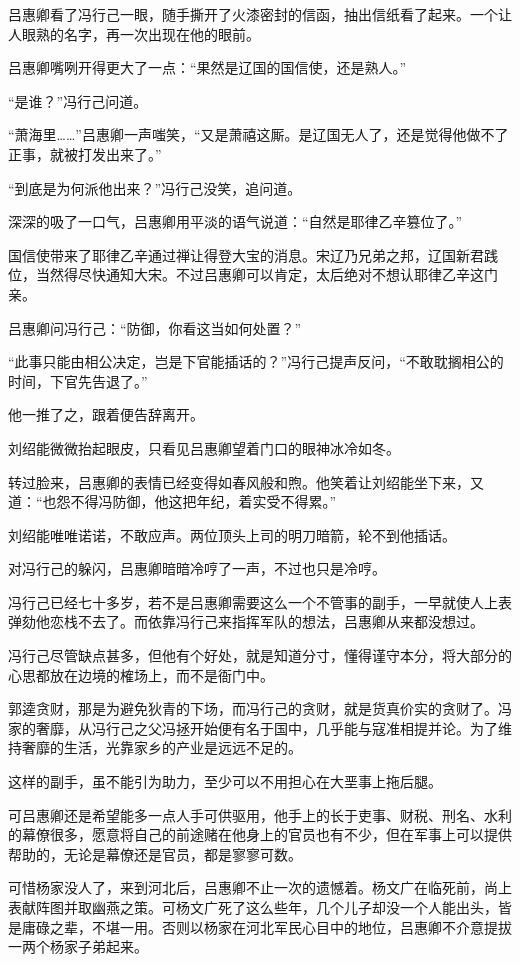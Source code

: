 吕惠卿看了冯行己一眼，随手撕开了火漆密封的信函，抽出信纸看了起来。一个让人眼熟的名字，再一次出现在他的眼前。

吕惠卿嘴咧开得更大了一点：“果然是辽国的国信使，还是熟人。”

“是谁？”冯行己问道。

“萧海里……”吕惠卿一声嗤笑，“又是萧禧这厮。是辽国无人了，还是觉得他做不了正事，就被打发出来了。”

“到底是为何派他出来？”冯行己没笑，追问道。

深深的吸了一口气，吕惠卿用平淡的语气说道：“自然是耶律乙辛篡位了。”

国信使带来了耶律乙辛通过禅让得登大宝的消息。宋辽乃兄弟之邦，辽国新君践位，当然得尽快通知大宋。不过吕惠卿可以肯定，太后绝对不想认耶律乙辛这门亲。

吕惠卿问冯行己：“防御，你看这当如何处置？”

“此事只能由相公决定，岂是下官能插话的？”冯行己提声反问，“不敢耽搁相公的时间，下官先告退了。”

他一推了之，跟着便告辞离开。

刘绍能微微抬起眼皮，只看见吕惠卿望着门口的眼神冰冷如冬。

转过脸来，吕惠卿的表情已经变得如春风般和煦。他笑着让刘绍能坐下来，又道：“也怨不得冯防御，他这把年纪，着实受不得累。”

刘绍能唯唯诺诺，不敢应声。两位顶头上司的明刀暗箭，轮不到他插话。

对冯行己的躲闪，吕惠卿暗暗冷哼了一声，不过也只是冷哼。

冯行己已经七十多岁，若不是吕惠卿需要这么一个不管事的副手，一早就使人上表弹劾他恋栈不去了。而依靠冯行己来指挥军队的想法，吕惠卿从来都没想过。

冯行己尽管缺点甚多，但他有个好处，就是知道分寸，懂得谨守本分，将大部分的心思都放在边境的榷场上，而不是衙门中。

郭逵贪财，那是为避免狄青的下场，而冯行己的贪财，就是货真价实的贪财了。冯家的奢靡，从冯行己之父冯拯开始便有名于国中，几乎能与寇准相提并论。为了维持奢靡的生活，光靠家乡的产业是远远不足的。

这样的副手，虽不能引为助力，至少可以不用担心在大垩事上拖后腿。

可吕惠卿还是希望能多一点人手可供驱用，他手上的长于吏事、财税、刑名、水利的幕僚很多，愿意将自己的前途赌在他身上的官员也有不少，但在军事上可以提供帮助的，无论是幕僚还是官员，都是寥寥可数。

可惜杨家没人了，来到河北后，吕惠卿不止一次的遗憾着。杨文广在临死前，尚上表献阵图并取幽燕之策。可杨文广死了这么些年，几个儿子却没一个人能出头，皆是庸碌之辈，不堪一用。否则以杨家在河北军民心目中的地位，吕惠卿不介意提拔一两个杨家子弟起来。

